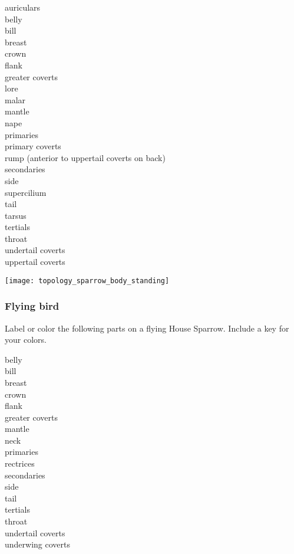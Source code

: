 \documentclass[10pt]{article}
\begin{document}
\begin{multicols}{3}
auriculars\\
belly\\
bill\\
breast\\
crown\\
flank\\
greater coverts\\
lore\\
malar\\
mantle\\
nape\\
primaries\\
primary coverts\\
rump (anterior to uppertail\newline
\phantom{M}coverts on back)\\
secondaries\\
side\\
supercilium\\
tail\\
tarsus\\
tertials\\
throat\\
undertail coverts\\
uppertail coverts
\end{multicols}

\begin{center}
\texttt{[image: topology\_sparrow\_body\_standing]}
\end{center}

\subsubsection*{Flying bird}

Label or color the following parts on a flying House Sparrow. Include a key for your colors.


\begin{multicols}{3}
belly\\
bill\\
breast\\
crown\\
flank\\
greater coverts\\
mantle\\
neck\\
primaries\\
rectrices\\
secondaries\\
side\\
tail\\
tertials\\
throat\\
undertail coverts\\
underwing coverts
\end{multicols}
\end{document}
